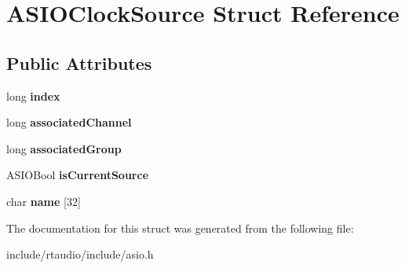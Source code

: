 \hypertarget{struct_a_s_i_o_clock_source}{}\section{A\+S\+I\+O\+Clock\+Source Struct Reference}
\label{struct_a_s_i_o_clock_source}
\subsection*{Public Attributes}
\begin{DoxyCompactItemize}
\item 
long {\bfseries index}\hypertarget{struct_a_s_i_o_clock_source_ae5173946a74b00f98db38e8f7d2e5e5e}{}\label{struct_a_s_i_o_clock_source_ae5173946a74b00f98db38e8f7d2e5e5e}

\item 
long {\bfseries associated\+Channel}\hypertarget{struct_a_s_i_o_clock_source_a761460005e63404a0d8ca73c07e601d4}{}\label{struct_a_s_i_o_clock_source_a761460005e63404a0d8ca73c07e601d4}

\item 
long {\bfseries associated\+Group}\hypertarget{struct_a_s_i_o_clock_source_ab4bd649253d0360eafc0eb2d5fb50155}{}\label{struct_a_s_i_o_clock_source_ab4bd649253d0360eafc0eb2d5fb50155}

\item 
A\+S\+I\+O\+Bool {\bfseries is\+Current\+Source}\hypertarget{struct_a_s_i_o_clock_source_a7de11529da990cdbe35f2f53a77bff41}{}\label{struct_a_s_i_o_clock_source_a7de11529da990cdbe35f2f53a77bff41}

\item 
char {\bfseries name} \mbox{[}32\mbox{]}\hypertarget{struct_a_s_i_o_clock_source_a16d8e4c9b1d955a72827096b67bf86ef}{}\label{struct_a_s_i_o_clock_source_a16d8e4c9b1d955a72827096b67bf86ef}

\end{DoxyCompactItemize}


The documentation for this struct was generated from the following file\+:\begin{DoxyCompactItemize}
\item 
include/rtaudio/include/asio.\+h\end{DoxyCompactItemize}
